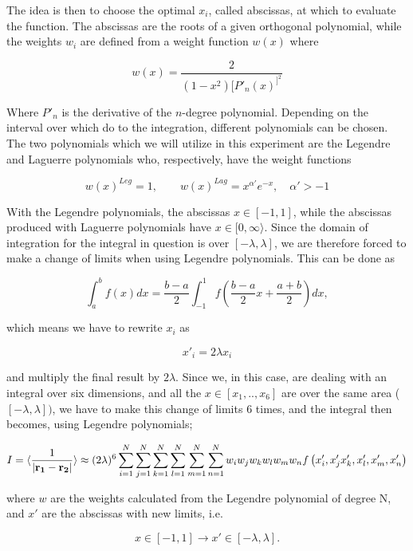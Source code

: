\documentclass[a4paper,10pt,english]{article}
\begin{document}
The idea is then to choose the optimal $x_i$, called abscissas, at which to evaluate the function. The abscissas are the roots of a given orthogonal polynomial, while the weights $w_i$ are defined from a weight function $w(x)$ where

\begin{equation}
    w(x) = \frac{2}{(1 - x^2)[P'_n(x)^]^2}
\end{equation}

Where $P'_n$ is the derivative of the $n$-degree polynomial. Depending on the interval over which do to the integration, different polynomials can be chosen. The two polynomials which we will utilize in this experiment are the Legendre and Laguerre polynomials who, respectively, have the weight functions

$$w(x)^{Leg} = 1, \qquad w(x)^{Lag} = x^{\alpha'} e^{-x}, \quad \alpha' > -1$$

With the Legendre polynomials, the abscissas $x \in [-1, 1]$, while the abscissas produced with Laguerre polynomials have $x \in [0, \infty \rangle$. Since the domain of integration for the integral in question is over $[-\lambda, \lambda]$, we are therefore forced to make a change of limits when using Legendre polynomials. This can be done as

$$\int_a^b f(x) dx = \frac{b - a}{2}\int_{-1}^1 f\left(\frac{b - a}{2}x + \frac{a + b}{2}\right) dx,$$

which means we have to rewrite $x_i$ as

$$x'_i = 2\lambda x_i $$

and multiply the final result by $2\lambda$. Since we, in this case, are dealing with an integral over six dimensions, and all the $x \in [x_1,..,x_6]$ are over the same area ($[-\lambda, \lambda])$, we have to make this change of limits 6 times, and the integral then becomes, using Legendre polynomials;

\begin{equation}\label{eq:spherical_quad}
    I = \langle \frac{1}{|\bold{r_1} - \bold{r_2}|}\rangle \approx (2\lambda)^6 \sum_{i = 1}^N \sum_{j = 1}^N \sum_{k = 1}^N \sum_{l = 1}^N \sum_{m= 1}^N \sum_{n = 1}^N w_i w_j w_k w_l w_m w_n f\left(x'_i, x'_j x'_k, x'_l, x'_m, x'_n\right)
\end{equation} 

where $w$ are the weights calculated from the Legendre polynomial of degree N, and $x'$ are the abscissas with new limits, i.e.

$$x \in [-1, 1] \rightarrow x' \in [-\lambda, \lambda].$$
\end{document}
